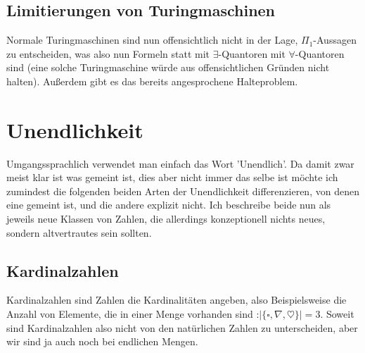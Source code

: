 \documentclass{scrartcl}
\begin{document}


\subsection{Limitierungen von Turingmaschinen}
Normale Turingmaschinen sind nun offensichtlich nicht in der Lage,
$\Pi_1$-Aussagen zu entscheiden, was also nun Formeln statt mit
$\exists$-Quantoren mit $\forall$-Quantoren sind (eine solche Turingmaschine
würde aus offensichtlichen Gründen nicht halten). Außerdem gibt es das bereits
angesprochene Halteproblem.


\section{Unendlichkeit}
Umgangssprachlich verwendet man einfach das Wort 'Unendlich'. Da damit zwar
meist klar ist was gemeint ist, dies aber nicht immer das selbe ist möchte ich
zumindest die folgenden beiden Arten der Unendlichkeit differenzieren, von
denen eine gemeint ist, und die andere explizit nicht. Ich beschreibe beide nun
als jeweils neue Klassen von Zahlen, die allerdings konzeptionell nichts neues,
sondern altvertrautes sein sollten.


\subsection{Kardinalzahlen}
Kardinalzahlen sind Zahlen die Kardinalitäten angeben, also Beispielsweise die
Anzahl von Elemente, die in einer Menge vorhanden sind :$|\{\square, \nabla, \heartsuit \} | =
3$. Soweit sind Kardinalzahlen also nicht von den natürlichen Zahlen zu
unterscheiden, 
aber wir sind ja auch noch bei endlichen Mengen.
\end{document}
